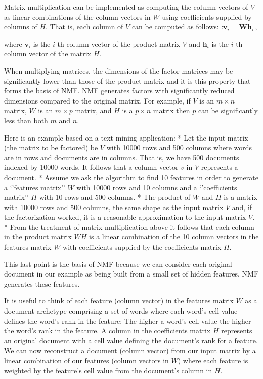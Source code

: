 \documentclass[11pt]{article}
\begin{document}
Matrix multiplication can be implemented as computing the column vectors
of \(V\) as linear combinations of the column vectors in \(W\) using
coefficients supplied by columns of \(H\). That is, each column of \(V\)
can be computed as follows:
:\(\mathbf{v}_i = \mathbf{W} \mathbf{h}_{i} \,,\)

where \(\mathbf{v}_i\) is the \(i\)-th column vector of the product
matrix \(V\) and \(\mathbf{h}_{i}\) is the \(i\)-th column vector of the
matrix \(H\).

When multiplying matrices, the dimensions of the factor matrices may be
significantly lower than those of the product matrix and it is this
property that forms the basis of NMF. NMF generates factors with
significantly reduced dimensions compared to the original matrix. For
example, if \(V\) is an \(m × n\) matrix, \(W\) is an \(m × p\) matrix,
and \(H\) is a \(p × n\) matrix then \(p\) can be significantly less
than both \(m\) and \(n\).

Here is an example based on a text-mining application: * Let the input
matrix (the matrix to be factored) be \(V\) with 10000 rows and 500
columns where words are in rows and documents are in columns. That is,
we have 500 documents indexed by 10000 words. It follows that a column
vector \(v\) in \(V\) represents a document. * Assume we ask the
algorithm to find 10 features in order to generate a `'features matrix''
\(W\) with 10000 rows and 10 columns and a `'coefficients matrix'' \(H\)
with 10 rows and 500 columns. * The product of \(W\) and \(H\) is a
matrix with 10000 rows and 500 columns, the same shape as the input
matrix \(V\) and, if the factorization worked, it is a reasonable
approximation to the input matrix \(V\). * From the treatment of matrix
multiplication above it follows that each column in the product matrix
\(WH\) is a linear combination of the 10 column vectors in the features
matrix \(W\) with coefficients supplied by the coefficients matrix
\(H\).

This last point is the basis of NMF because we can consider each
original document in our example as being built from a small set of
hidden features. NMF generates these features.

It is useful to think of each feature (column vector) in the features
matrix \(W\) as a document archetype comprising a set of words where
each word's cell value defines the word's rank in the feature: The
higher a word's cell value the higher the word's rank in the feature. A
column in the coefficients matrix \(H\) represents an original document
with a cell value defining the document's rank for a feature. We can now
reconstruct a document (column vector) from our input matrix by a linear
combination of our features (column vectors in \(W\)) where each feature
is weighted by the feature's cell value from the document's column in
\(H\).
\end{document}
